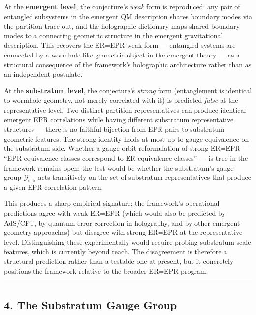 \documentclass[
]{article}
\begin{document}
At the \textbf{emergent level}, the conjecture's \emph{weak} form is
reproduced: any pair of entangled subsystems in the emergent QM
description shares boundary modes via the partition trace-out, and the
holographic dictionary maps shared boundary modes to a connecting
geometric structure in the emergent gravitational description. This
recovers the ER=EPR weak form --- entangled systems are connected by a
wormhole-like geometric object in the emergent theory --- as a
structural consequence of the framework's holographic architecture
rather than as an independent postulate.

At the \textbf{substratum level}, the conjecture's \emph{strong} form
(entanglement is identical to wormhole geometry, not merely correlated
with it) is predicted \emph{false} at the representative level. Two
distinct partition representatives can produce identical emergent EPR
correlations while having different substratum representative structures
--- there is no faithful bijection from EPR pairs to substratum
geometric features. The strong identity holds at most up to gauge
equivalence on the substratum side. Whether a gauge-orbit reformulation
of strong ER=EPR --- ``EPR-equivalence-classes correspond to
ER-equivalence-classes'' --- is true in the framework remains open; the
test would be whether the substratum's gauge group
\(\mathcal{G}_{\text{sub}}\) acts transitively on the set of substratum
representatives that produce a given EPR correlation pattern.

This produces a sharp empirical signature: the framework's operational
predictions agree with weak ER=EPR (which would also be predicted by
AdS/CFT, by quantum error correction in holography, and by other
emergent-geometry approaches) but disagree with strong ER=EPR at the
representative level. Distinguishing these experimentally would require
probing substratum-scale features, which is currently beyond reach. The
disagreement is therefore a structural prediction rather than a testable
one at present, but it concretely positions the framework relative to
the broader ER=EPR program.

\begin{center}\rule{0.5\linewidth}{0.5pt}\end{center}

\hypertarget{the-substratum-gauge-group}{%
\subsection{4. The Substratum Gauge
Group}\label{the-substratum-gauge-group}}
\end{document}

